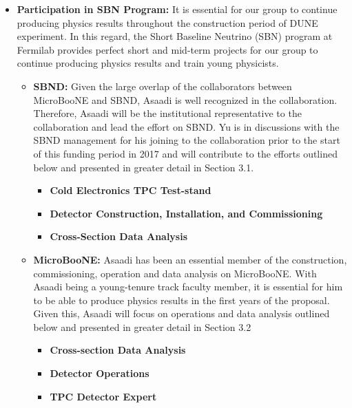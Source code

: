 \begin{itemize}
\item{{\bf Participation in SBN Program:} It is essential for our group to continue producing physics results throughout the construction period of DUNE experiment.   In this regard, the Short Baseline Neutrino (SBN) program at Fermilab provides perfect short and mid-term projects for our group to continue producing physics results and train young physicists.}


\begin{itemize}

\item {{\bf SBND:} Given the large overlap of the collaborators between MicroBooNE and SBND, Asaadi is well recognized in the collaboration.  Therefore, Asaadi will be the institutional representative to the collaboration and lead the effort on SBND.  Yu is in discussions with the SBND management for his joining to the collaboration prior to the start of this funding period in 2017 and will contribute to the efforts outlined below and presented in greater detail in Section 3.1. } 
\begin{itemize}
\item{\textbf{Cold Electronics TPC Test-stand}}

\item{\textbf{Detector Construction, Installation, and Commissioning}}

\item{\textbf{Cross-Section Data Analysis}}

\end{itemize}

\item{{\bf MicroBooNE:} Asaadi has been an essential member of the construction, commissioning, operation and data analysis on MicroBooNE. With Asaadi being a young-tenure track faculty member, it is essential for him to be able to produce physics results in the first years of the proposal. Given this, Asaadi will focus on operations and data analysis outlined below and presented in greater detail in Section 3.2}

\begin{itemize}
\item{\textbf{Cross-section Data Analysis}}
\item{\textbf{Detector Operations}}
\item{\textbf{TPC Detector Expert}}

\end{itemize}



\end{itemize}
\end{itemize}
